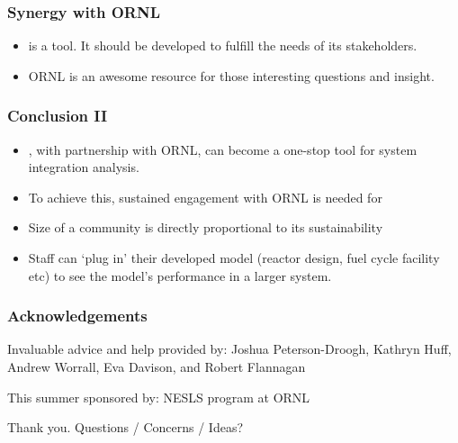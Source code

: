 \begin{frame}
	\frametitle{Synergy with ORNL}
	\begin{itemize}
		\item \Cyclus is a tool. It should be developed to fulfill the needs of its stakeholders.
		\item ORNL is an awesome resource for those interesting questions and insight.
	\end{itemize}
\end{frame}


\begin{frame}
	\frametitle{Conclusion II}
	\begin{itemize}
		\item \Cyclus, with partnership with ORNL, can become a one-stop tool for system integration analysis.
        \item To achieve this, sustained engagement with ORNL is needed for \Cyclus
        \item Size of a community is directly proportional to its sustainability
		\item Staff can `plug in' their developed model (reactor design, fuel cycle facility etc) to see the model's performance in a larger system.
	\end{itemize}
\end{frame}




\begin{frame}
    \frametitle{Acknowledgements}
    Invaluable advice and help provided by:
    Joshua Peterson-Droogh, Kathryn Huff, Andrew Worrall, Eva Davison, and Robert Flannagan

    This summer sponsored by:
    NESLS program at ORNL

\end{frame}

\begin{frame}
    Thank you. Questions / Concerns / Ideas?
\end{frame}